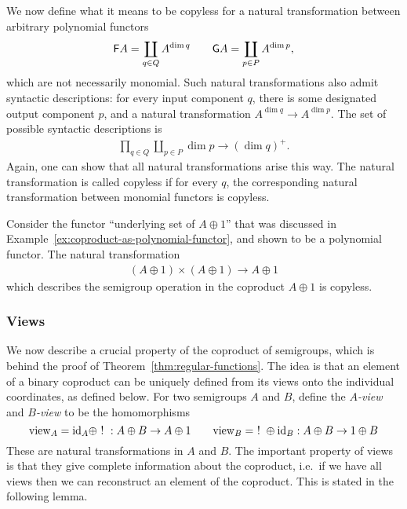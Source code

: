 We now define what it means to be copyless for a natural transformation between arbitrary polynomial functors 
\begin{align*}
\mathsf F A = \coprod_{q \in Q} A^{\dim q} \qquad 
\mathsf G A = \coprod_{p \in P} A^{\dim p},
\end{align*}
which are not necessarily monomial. Such natural transformations also admit syntactic descriptions: for every input component $q$, there is some designated output component $p$, and a natural transformation $A^{\dim q} \to A^{\dim p}$.  The set of possible syntactic descriptions is
\begin{align*}
\prod_{q \in Q} \coprod_{p \in P} \dim p \to (\dim q)^+.
\end{align*}
Again, one can show that all natural transformations arise this way. The natural transformation is called copyless if for every $q$, the corresponding natural transformation between monomial functors is copyless. 


\begin{myexample}\label{ex:copyless-on-coproducts}
    Consider the functor \enquote{underlying set of $A \oplus 1$} that was discussed in Example~\ref{ex:coproduct-as-polynomial-functor}, and shown to be a polynomial functor. The natural transformation 
    \begin{align*}
    (A \oplus 1)\times (A \oplus 1) \to A \oplus 1
    \end{align*}
    which describes the semigroup operation in the coproduct $A \oplus 1$ is copyless.
\end{myexample}


\subsubsection{Views}
\label{sec:views}

\newcommand{\combine}{\mathrm{combine}}
\newcommand{\view}{\mathrm{view}}

We now describe a crucial property of the coproduct of semigroups, which is behind the proof of Theorem~\ref{thm:regular-functions}. The idea is that an element of a binary coproduct can be uniquely defined from its views onto the individual coordinates, as defined below. 
For two semigroups $A$ and $B$, define the \emph{$A$-view} and \emph{$B$-view} to be the homomorphisms
\[
    \view_A = \id_A \oplus ~!~ : A \oplus B \to A \oplus 1 \qquad 
    \view_B = ~!~ \oplus \id_B : A \oplus B \to 1 \oplus B
\]
These are natural transformations in $A$ and $B$. The important property of views is that they give complete information about the coproduct, i.e.~if we have all views then we can reconstruct an element of the coproduct.
This is stated in the following lemma. 

